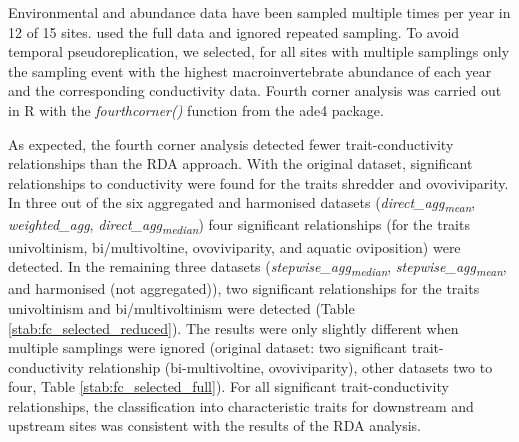 \documentclass[12pt]{article}
\begin{document}
Environmental and abundance data have been sampled multiple times per year in 12 of 15 sites. \citet{szocs_effects_2014} used the full data and ignored repeated sampling. To avoid temporal pseudoreplication, we selected, for all sites with multiple samplings only the sampling event with the highest macroinvertebrate abundance of each year and the corresponding conductivity data. Fourth corner analysis was carried out in R with the \textit{fourthcorner()} function from the ade4 package.

As expected, the fourth corner analysis detected fewer trait-conductivity relationships than the RDA approach. With the original dataset, significant relationships to conductivity were found for the traits shredder and ovoviviparity. In three out of the six aggregated and harmonised datasets (\textit{direct\_agg\textsubscript{mean}}, \textit{weighted\_agg}, \textit{direct\_agg\textsubscript{median}}) four significant relationships (for the traits univoltinism, bi/multivoltine, ovoviviparity, and aquatic oviposition) were detected. In the remaining three datasets (\textit{stepwise\_agg\textsubscript{median}}, \textit{stepwise\_agg\textsubscript{mean}}, and harmonised (not aggregated)), two significant relationships for the traits univoltinism and bi/multivoltinism were detected (Table \ref{stab:fc_selected_reduced}). The results were only slightly different when multiple samplings were ignored (original dataset: two significant trait-conductivity relationship (bi-multivoltine, ovoviviparity), other datasets two to four, Table \ref{stab:fc_selected_full}). For all significant trait-conductivity relationships, the classification into characteristic traits for downstream and upstream sites was consistent with the results of the RDA analysis.

\newpage
\end{document}
